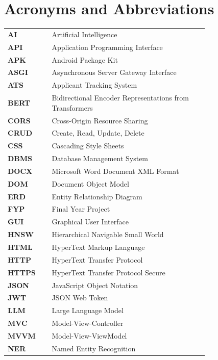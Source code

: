 \chapter*{Acronyms and Abbreviations}

\begin{flushleft}
\begin{tabular}{l p{0.78\linewidth}}
\textbf{AI}    & Artificial Intelligence\\
\textbf{API}   & Application Programming Interface\\
\textbf{APK}   & Android Package Kit\\
\textbf{ASGI}  & Asynchronous Server Gateway Interface\\
\textbf{ATS}   & Applicant Tracking System\\
\textbf{BERT}  & Bidirectional Encoder Representations from Transformers\\
\textbf{CORS}  & Cross-Origin Resource Sharing\\
\textbf{CRUD}  & Create, Read, Update, Delete\\
\textbf{CSS}   & Cascading Style Sheets\\
\textbf{DBMS}  & Database Management System\\
\textbf{DOCX}  & Microsoft Word Document XML Format\\
\textbf{DOM}   & Document Object Model\\
\textbf{ERD}   & Entity Relationship Diagram\\
\textbf{FYP}   & Final Year Project\\
\textbf{GUI}   & Graphical User Interface\\
\textbf{HNSW}  & Hierarchical Navigable Small World\\
\textbf{HTML}  & HyperText Markup Language\\
\textbf{HTTP}  & HyperText Transfer Protocol\\
\textbf{HTTPS} & HyperText Transfer Protocol Secure\\
\textbf{JSON}  & JavaScript Object Notation\\
\textbf{JWT}   & JSON Web Token\\
\textbf{LLM}   & Large Language Model\\
\textbf{MVC}   & Model-View-Controller\\
\textbf{MVVM}  & Model-View-ViewModel\\
\textbf{NER}   & Named Entity Recognition\\

\end{tabular}
\end{flushleft}
